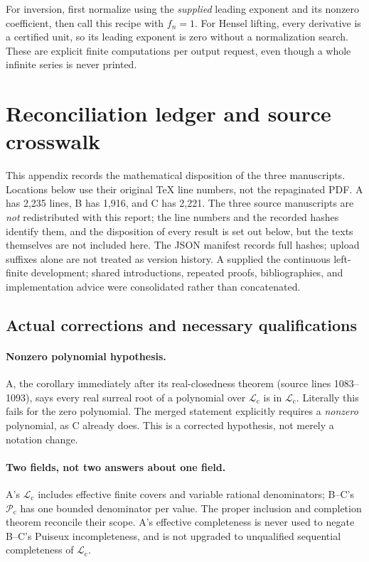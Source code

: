 \documentclass[11pt,letterpaper]{article}
\numberwithin{equation}{section}
\theoremstyle{definition}
\theoremstyle{remark}
\newcommand{\Lc}{\mathcal L_{\mathrm c}}
\newcommand{\Pc}{\mathcal P_{\mathrm c}}
\begin{document}
For inversion, first normalize using the \emph{supplied} leading exponent
and its nonzero coefficient, then call this recipe with $f_n=1$. For Hensel
lifting, every derivative is a certified unit, so its leading exponent is
zero without a normalization search. These are explicit finite
computations per output request, even though a whole infinite series is
never printed.


\clearpage
\section{Reconciliation ledger and source crosswalk}
\label{app:reconcile}
This appendix records the mathematical disposition of the three manuscripts.
Locations below use their original TeX line numbers, not the repaginated PDF.
A has 2,235 lines, B has 1,916, and C has 2,221.  The three source manuscripts
are \emph{not} redistributed with this report; the line numbers and the
recorded hashes identify them, and the disposition of every result is set out
below, but the texts themselves are not included here.
The JSON manifest records full hashes; upload suffixes alone are not treated
as version history. A supplied the continuous left-finite development; shared
introductions, repeated proofs, bibliographies, and implementation advice were
consolidated rather than concatenated.

\subsection{Actual corrections and necessary qualifications}
\paragraph{Nonzero polynomial hypothesis.}
A, the corollary immediately after its real-closedness theorem (source lines
1083--1093), says every real surreal root of a polynomial over $\Lc$ is in
$\Lc$. Literally this fails for the zero polynomial. The merged statement
explicitly requires a \emph{nonzero} polynomial, as C already does. This is a
corrected hypothesis, not merely a notation change.

\paragraph{Two fields, not two answers about one field.}
A's $\Lc$ includes effective finite covers and variable rational denominators;
B--C's $\Pc$ has one bounded denominator per value. The proper inclusion and
completion theorem reconcile their scope. A's effective completeness is
never used to negate B--C's Puiseux incompleteness, and is not upgraded to
unqualified sequential completeness of $\Lc$.
\end{document}
